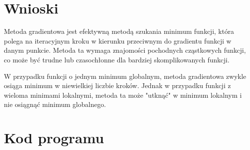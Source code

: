 \documentclass{article}
\begin{document}
\section{Wnioski}
Metoda gradientowa jest efektywną metodą szukania minimum funkcji, 
która polega na iteracyjnym kroku w kierunku przeciwnym do gradientu 
funkcji w danym punkcie. Metoda ta wymaga znajomości pochodnych 
cząstkowych funkcji, co może być trudne lub czasochłonne dla bardziej 
skomplikowanych funkcji.

W przypadku funkcji o jednym minimum globalnym, metoda gradientowa 
zwykle osiąga minimum w niewielkiej liczbie kroków. Jednak w przypadku 
funkcji z wieloma minimami lokalnymi, metoda ta może "utknąć" w minimum 
lokalnym i nie osiągnąć minimum globalnego.

\section{Kod programu}

\end{document}

